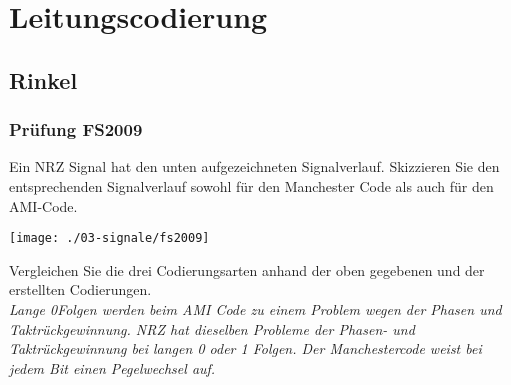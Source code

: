 

\section{Leitungscodierung}
\subsection{Rinkel}
\subsubsection{Prüfung FS2009}
Ein NRZ Signal hat den unten aufgezeichneten Signalverlauf. Skizzieren Sie den entsprechenden Signalverlauf sowohl für den Manchester Code als auch für den AMI-Code.
\begin{center}
    \vspace{-8pt}
    \texttt{[image: ./03-signale/fs2009]}
    \vspace{-8pt}
\end{center}

Vergleichen Sie die drei Codierungsarten anhand der oben gegebenen und der erstellten Codierungen.\\
\textit{Lange 0Folgen werden beim AMI Code zu einem Problem wegen der Phasen und Taktrückgewinnung. NRZ hat dieselben Probleme der Phasen- und Taktrückgewinnung bei
langen 0 oder 1 Folgen. Der Manchestercode weist bei jedem Bit einen Pegelwechsel auf.}